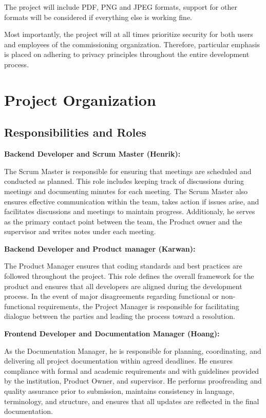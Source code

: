 The project will include PDF, PNG and JPEG formats, support for other formats will be considered if everything else is working fine.

Most importantly, the project will at all times prioritize security for both users and employees of the commissioning organization. Therefore, particular emphasis is placed on adhering to privacy principles throughout the entire development process.

\section{Project Organization}

\subsection{Responsibilities and Roles}
\label{appsec:group}

\textbf{Backend Developer and Scrum Master (Henrik):}

The Scrum Master is responsible for ensuring that meetings are scheduled and conducted as planned. This role includes keeping track of discussions during meetings and documenting minutes for each meeting. The Scrum Master also ensures effective communication within the team, takes action if issues arise, and facilitates discussions and meetings to maintain progress. Additionaly, he serves as the primary contact point between the team, the Product owner and the supervisor and writes notes under each meeting.

\textbf{Backend Developer and Product manager (Karwan):}

The Product Manager ensures that coding standards and best practices are followed throughout the project. This role defines the overall framework for the product and ensures that all developers are aligned during the development process. In the event of major disagreements regarding functional or non-functional requirements, the Project Manager is responsible for facilitating dialogue between the parties and leading the process toward a resolution.

\textbf{Frontend Developer and Documentation Manager (Hoang):}

As the Documentation Manager, he is responsible for planning, coordinating, and delivering all project documentation within agreed deadlines. He ensures compliance with formal and academic requirements and with guidelines provided by the institution, Product Owner, and supervisor. He performs proofreading and quality assurance prior to submission, maintains consistency in language, terminology, and structure, and ensures that all updates are reflected in the final documentation.

